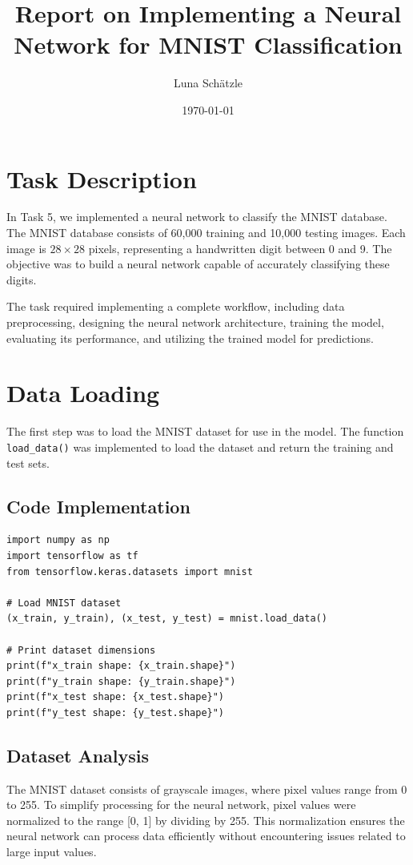 \documentclass[12pt,a4paper]{article}
\title{\textbf{Report on Implementing a Neural Network for MNIST Classification}}
\author{Luna Schätzle}
\date{\today}
\begin{document}
\maketitle

\section*{Task Description}
In Task 5, we implemented a neural network to classify the MNIST database. The MNIST database consists of 60,000 training and 10,000 testing images. Each image is $28 \times 28$ pixels, representing a handwritten digit between 0 and 9. The objective was to build a neural network capable of accurately classifying these digits.

The task required implementing a complete workflow, including data preprocessing, designing the neural network architecture, training the model, evaluating its performance, and utilizing the trained model for predictions.

\section*{Data Loading}
The first step was to load the MNIST dataset for use in the model. The function \texttt{load\_data()} was implemented to load the dataset and return the training and test sets.

\subsection*{Code Implementation}
\begin{lstlisting}
import numpy as np
import tensorflow as tf
from tensorflow.keras.datasets import mnist

# Load MNIST dataset
(x_train, y_train), (x_test, y_test) = mnist.load_data()

# Print dataset dimensions
print(f"x_train shape: {x_train.shape}")
print(f"y_train shape: {y_train.shape}")
print(f"x_test shape: {x_test.shape}")
print(f"y_test shape: {y_test.shape}")
\end{lstlisting}

\subsection*{Dataset Analysis}
The MNIST dataset consists of grayscale images, where pixel values range from 0 to 255. To simplify processing for the neural network, pixel values were normalized to the range [0, 1] by dividing by 255. This normalization ensures the neural network can process data efficiently without encountering issues related to large input values.
\end{document}
